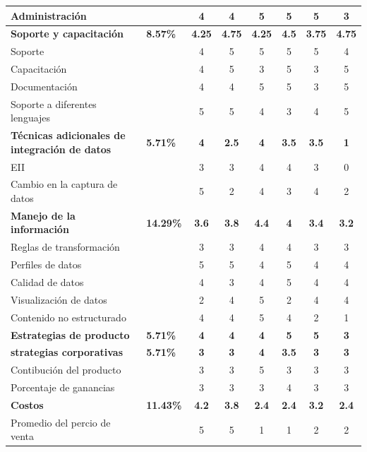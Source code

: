 \documentclass[a4paper,openright,12pt]{book}
\begin{document}
\begin{table}[htbp]
\begin{center}
{\begin{tabular}{|p{5.5cm}|>{\centering\arraybackslash}m{1.7cm}|c|c|c|c|c|c|}
\hline 
Administración & & 4 & 4 & 5 & 5 & 5 & 3\\
\hline
\rowcolor[gray]{0.9}\textbf{Soporte y capacitación} & \textbf{8.57\%} & \textbf{4.25} & \textbf{4.75} & \textbf{4.25} & \textbf{4.5} & \textbf{3.75} & \textbf{4.75}\\
\hline
Soporte & & 4 & 5 & 5 & 5 & 5 & 4\\
\hline
Capacitación & & 4 & 5 & 3 & 5 & 3 & 5\\
\hline
Documentación & & 4 & 4 & 5 & 5 & 3 & 5\\
\hline
Soporte a diferentes lenguajes & & 5 & 5 & 4 & 3 & 4 & 5\\
\hline
\rowcolor[gray]{0.9}\textbf{Técnicas adicionales de integración de datos} & \textbf{5.71\%} &\textbf{ 4} & \textbf{2.5} & \textbf{4} & \textbf{3.5} & \textbf{3.5} & \textbf{1}\\
\hline
EII & & 3 & 3 & 4 & 4 & 3 & 0\\
\hline
Cambio en la captura de datos & & 5 & 2 & 4 & 3 & 4 & 2\\
\hline
\rowcolor[gray]{0.9}\textbf{Manejo de la información} & \textbf{14.29\%} & \textbf{3.6} & \textbf{3.8} & \textbf{4.4} & \textbf{4} & \textbf{3.4} & \textbf{3.2}\\
\hline
Reglas de transformación & & 3 & 3 & 4 & 4 & 3 & 3\\
\hline
Perfiles de datos & & 5 & 5 & 4 & 5 & 4 & 4\\
\hline
Calidad de datos & & 4 & 3 & 4 & 5 & 4 & 4\\
\hline
Visualización de datos & & 2 & 4 & 5 & 2 & 4 & 4\\
\hline
Contenido no estructurado & & 4 & 4 & 5 & 4 & 2 & 1\\
\hline
\rowcolor[gray]{0.9}\textbf{Estrategias de producto} & \textbf{5.71\%} & \textbf{4} & \textbf{4} & \textbf{4} & \textbf{5} & \textbf{5} & \textbf{3}\\
\hline
\rowcolor[gray]{0.9}\textbf{strategias corporativas} & \textbf{5.71\%} & \textbf{3} &\textbf{ 3} & \textbf{4} & \textbf{3.5} & \textbf{3} & \textbf{3}\\
\hline
Contibución del producto & & 3 & 3 & 5 & 3 & 3 & 3\\
\hline
Porcentaje de ganancias & & 3 & 3 & 3 & 4 & 3 & 3\\
\hline
\rowcolor[gray]{0.9}\textbf{Costos} & \textbf{11.43\%} & \textbf{4.2} & \textbf{3.8} & \textbf{2.4} & \textbf{2.4} & \textbf{3.2} & \textbf{2.4}\\
\hline
Promedio del percio de venta & & 5 & 5 & 1 & 1 & 2 & 2\\

\end{tabular}}
\end{center}
\end{table}
\end{document}

